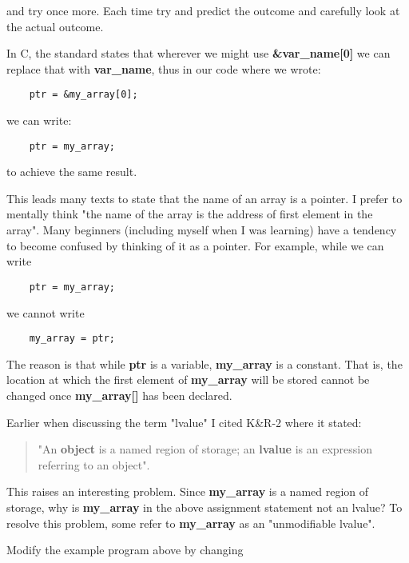 and try once more. Each time try and predict the outcome and carefully
look at the actual outcome.

In C, the standard states that wherever we might use
\textbf{\&var\_name{[}0{]}} we can replace that with \textbf{var\_name},
thus in our code where we wrote:

\begin{verbatim}
    ptr = &my_array[0];
\end{verbatim}

we can write:

\begin{verbatim}
    ptr = my_array;
\end{verbatim}

to achieve the same result.

This leads many texts to state that the name of an array is a pointer. I
prefer to mentally think "the name of the array is the address of first
element in the array". Many beginners (including myself when I was
learning) have a tendency to become confused by thinking of it as a
pointer. For example, while we can write

\begin{verbatim}
    ptr = my_array;
\end{verbatim}

we cannot write

\begin{verbatim}
    my_array = ptr;
\end{verbatim}

The reason is that while \textbf{ptr} is a variable, \textbf{my\_array}
is a constant. That is, the location at which the first element of
\textbf{my\_array} will be stored cannot be changed once
\textbf{my\_array{[}{]}} has been declared.

Earlier when discussing the term "lvalue" I cited K\&R-2 where it
stated:

\begin{quote}
"An \textbf{object} is a named region of storage; an \textbf{lvalue} is
an expression referring to an object".
\end{quote}

This raises an interesting problem. Since \textbf{my\_array} is a named
region of storage, why is \textbf{my\_array} in the above assignment
statement not an lvalue? To resolve this problem, some refer to
\textbf{my\_array} as an "unmodifiable lvalue".

Modify the example program above by changing

